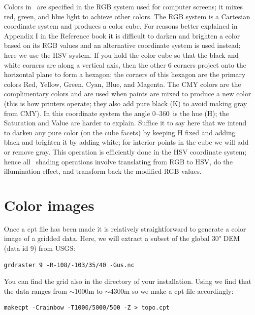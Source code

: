 \documentclass{report}
\begin{document}
Colors in \GMT\ are specified in the RGB system used for computer
screens; it mixes red, green, and blue light to achieve other colors.
The RGB system is a Cartesian coordinate system and produces a color cube.
For reasons better explained in Appendix I in the Reference book it is
difficult to darken and brighten a color based on its RGB values and an
alternative coordinate system is used instead; here we use the HSV system.
If you hold the color cube so that the black and white corners are along
a vertical axis, then the other 6 corners project onto the horizontal plane to
form a hexagon; the corners of this hexagon are the primary colors Red,
Yellow, Green, Cyan, Blue, and Magenta.
The CMY colors are the complimentary colors and are used when paints are
mixed to produce a new color (this is how printers operate; they also add
pure black (K) to avoid making gray from CMY).  In this coordinate system the
angle 0--360\DS\ is the hue (H); the Saturation and Value are harder to
explain.  Suffice it to say here that we intend to darken any pure color
(on the cube facets) by keeping H fixed and adding black and brighten it by adding white; for
interior points in the cube we will add or remove gray.
This operation is efficiently done in the HSV coordinate system; hence all
\GMT\ shading operations involve translating from RGB to HSV, do the
illumination effect, and transform back the modified RGB values.

\section{Color images}

Once a cpt file has been made it is relatively straightforward to generate
a color image of a gridded data.  Here, we will extract a subset of the
global 30" DEM (data id 9) from USGS:

{\small\begin{verbatim}
grdraster 9 -R-108/-103/35/40 -Gus.nc
\end{verbatim}
}

You can find the grid  also in the  directory
of your \GMT{} installation.
Using  we find that the data ranges from $\sim$1000m to
\noindent
$\sim$4300m so we make a cpt file accordingly:

{\small\begin{verbatim}
makecpt -Crainbow -T1000/5000/500 -Z > topo.cpt
\end{verbatim}
}
\end{document}
